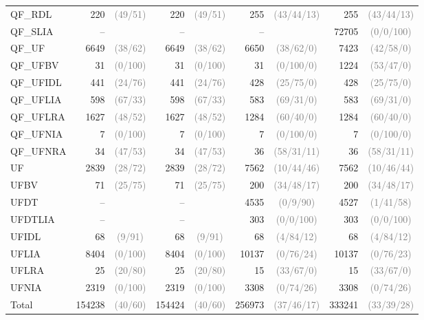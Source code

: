 \documentclass[dvipsnames,table,twoside,11pt]{article}
\newcommand{\gray}[1]{\textcolor{gray}{#1}}
\begin{document}
\begin{table}
{\begin{tabular}{lr@{\hskip3pt}cr@{\hskip3pt}cr@{\hskip3pt}cr@{\hskip3pt}c}
    QF\_RDL & 220 & \gray{(49/51)} & 220 & \gray{(49/51)} & 255 & \gray{(43/44/13)} & 255 & \gray{(43/44/13)}\\
    QF\_SLIA & -- & & -- & & -- & & 72705 & \gray{(0/0/100)}\\
    QF\_UF & 6649 & \gray{(38/62)} & 6649 & \gray{(38/62)} & 6650 & \gray{(38/62/0)} & 7423 & \gray{(42/58/0)}\\
    QF\_UFBV & 31 & \gray{(0/100)} & 31 & \gray{(0/100)} & 31 & \gray{(0/100/0)} & 1224 & \gray{(53/47/0)}\\
    QF\_UFIDL & 441 & \gray{(24/76)} & 441 & \gray{(24/76)} & 428 & \gray{(25/75/0)} & 428 & \gray{(25/75/0)}\\
    QF\_UFLIA & 598 & \gray{(67/33)} & 598 & \gray{(67/33)} & 583 & \gray{(69/31/0)} & 583 & \gray{(69/31/0)}\\
    QF\_UFLRA & 1627 & \gray{(48/52)} & 1627 & \gray{(48/52)} & 1284 & \gray{(60/40/0)} & 1284 & \gray{(60/40/0)}\\
    QF\_UFNIA & 7 & \gray{(0/100)} & 7 & \gray{(0/100)} & 7 & \gray{(0/100/0)} & 7 & \gray{(0/100/0)}\\
    QF\_UFNRA & 34 & \gray{(47/53)} & 34 & \gray{(47/53)} & 36 & \gray{(58/31/11)} & 36 & \gray{(58/31/11)}\\
    UF & 2839 & \gray{(28/72)} & 2839 & \gray{(28/72)} & 7562 & \gray{(10/44/46)} & 7562 & \gray{(10/46/44)}\\
    UFBV & 71 & \gray{(25/75)} & 71 & \gray{(25/75)} & 200 & \gray{(34/48/17)} & 200 & \gray{(34/48/17)}\\
    UFDT & -- & & -- & & 4535 & \gray{(0/9/90)} & 4527 & \gray{(1/41/58)}\\
    UFDTLIA & -- & & -- & & 303 & \gray{(0/0/100)} & 303 & \gray{(0/0/100)}\\
    UFIDL & 68 & \gray{(9/91)} & 68 & \gray{(9/91)} & 68 & \gray{(4/84/12)} & 68 & \gray{(4/84/12)}\\
    UFLIA & 8404 & \gray{(0/100)} & 8404 & \gray{(0/100)} & 10137 & \gray{(0/76/24)} & 10137 & \gray{(0/76/23)}\\
    UFLRA & 25 & \gray{(20/80)} & 25 & \gray{(20/80)} & 15 & \gray{(33/67/0)} & 15 & \gray{(33/67/0)}\\
    UFNIA & 2319 & \gray{(0/100)} & 2319 & \gray{(0/100)} & 3308 & \gray{(0/74/26)} & 3308 & \gray{(0/74/26)}\\
    \midrule
    Total      & 154238 & \gray{(40/60)} & 154424 & \gray{(40/60)} & 256973 & \gray{(37/46/17)} & 333241 & \gray{(33/39/28)}\\
    \bottomrule
  \end{tabular}}
\end{table}
\end{document}
